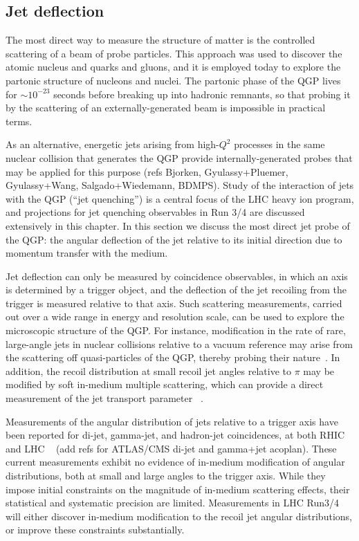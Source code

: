 \subsection{Jet deflection}
The most direct way to measure the structure of matter is the controlled scattering of a beam of probe particles. This approach was used to discover the atomic nucleus and quarks and gluons, and it is employed today to explore the partonic structure of nucleons and nuclei. The partonic phase of the QGP lives for $\sim10^{-23}$ seconds before breaking up into hadronic remnants, so that probing it by the scattering of an externally-generated beam is impossible in practical terms. 

As an alternative, energetic jets arising from high-$Q^2$ processes in the same nuclear collision that generates the QGP provide internally-generated probes that may be applied for this purpose (refs Bjorken, Gyulassy+Pluemer, Gyulassy+Wang, Salgado+Wiedemann, BDMPS). Study of the interaction of jets with the QGP (``jet quenching'') is a central focus of the LHC heavy ion program, and projections for jet quenching observables in Run 3/4 are discussed extensively in this chapter. In this section we discuss the most direct jet probe of the QGP: the angular deflection of the jet relative to its initial direction due to momentum transfer with the medium. 

Jet deflection can only be measured by coincidence observables, in which an axis is determined by a trigger object, and the deflection of the jet recoiling from the trigger is measured relative to that axis. Such scattering measurements, carried out over a wide range in energy and resolution scale, can be used to explore the microscopic structure of the QGP. For instance, modification in the rate of rare, large-angle jets in nuclear collisions relative to a vacuum reference may arise from the scattering off quasi-particles of the QGP, thereby probing their nature~\cite{DEramo:2012uzl}. In addition, the recoil distribution at small recoil jet angles relative to $\pi$ may be modified by soft in-medium multiple scattering, which can provide a direct measurement of the jet transport parameter \qhat~\cite{Chen:2016vem}.

Measurements of the angular distribution of jets relative to a trigger axis have been reported for di-jet, gamma-jet, and hadron-jet coincidences, at both RHIC~\cite{Adamczyk:2017yhe} and LHC ~\cite{Adam:2015doa} (add refs for ATLAS/CMS di-jet and gamma+jet acoplan). These current measurements exhibit no evidence of in-medium modification of angular distributions, both at small and large angles to the trigger axis. While they impose initial constraints on the magnitude of in-medium scattering effects, their statistical and systematic precision are limited. Measurements in LHC Run3/4 will either discover in-medium modification to the recoil jet angular distributions, or improve these constraints substantially.

